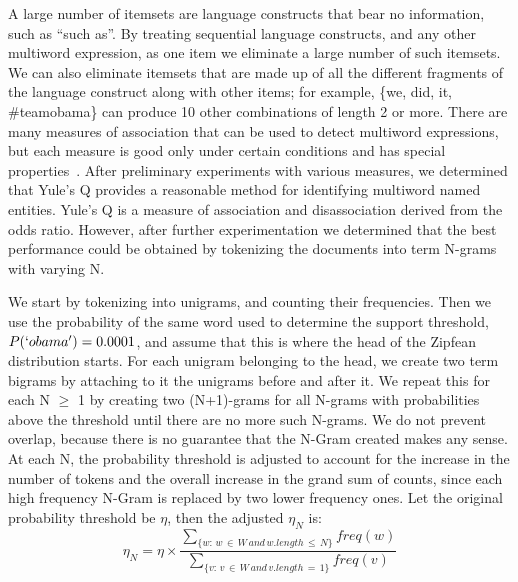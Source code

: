 \documentclass{sig-alternate}
\begin{document}
A large number of itemsets are language constructs that bear no information,
such as ``such as''. 
By treating sequential language constructs, and any other multiword expression,
as one item we eliminate a large number of such itemsets.
We can also eliminate itemsets that are made up of all the different fragments
of the language construct along with other items;
for example, \{we, did, it, \#teamobama\} can produce 10 other combinations of
length 2 or more.
There are many measures of association that can be used to detect multiword
expressions, but each measure is good only under certain conditions and has
special properties~\cite{ramisch2012broad}.
After preliminary experiments with various measures, we determined that
Yule's Q \cite{tan2002selecting} provides a reasonable method for
identifying multiword named entities.
Yule's Q is a measure of association and disassociation derived from the
odds ratio.
However, after further experimentation we determined that the best performance
could be obtained by tokenizing the documents into term N-grams with varying N. 

We start by tokenizing into unigrams, and counting their frequencies.
Then we use the probability of the same word used to determine the support
threshold, $P(`obama') = 0.0001$, and assume that this is where the head of
the Zipfean distribution starts.
For each unigram belonging to the head, we create two term bigrams by
attaching to it the unigrams before and after it.
We repeat this for each N $\ge$ 1 by creating two (N+1)-grams for all N-grams
with probabilities above the threshold until there are no more such N-grams.
We do not prevent overlap, because there is no guarantee that the N-Gram
created makes any sense.
At each N, the probability threshold is adjusted to account for the increase
in the number of tokens and the overall increase in the grand sum of counts,
since each high frequency N-Gram is replaced by two lower frequency ones.
Let the original probability threshold be $\eta$, then the adjusted $\eta_N$
is:
\begin{equation}\eta_N = \eta \times \frac{\sum_{\{w:\, w \,\in\, W\, and\, w.length \,\le\, N\}}{freq(w)}}{\sum_{\{v:\, v\, \in\, W \,and \,v.length\,=\,1\}}{freq(v)}}\end{equation}
\end{document}
